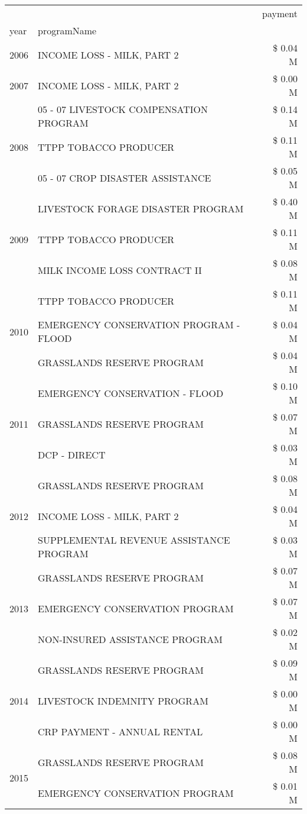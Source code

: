 \begin{tabular}{llr}
\toprule
 &  & payment \\
year & programName &  \\
\midrule
2006 & INCOME LOSS - MILK, PART 2 & \$ 0.04 M \\
\cline{1-3}
2007 & INCOME LOSS - MILK, PART 2 & \$ 0.00 M \\
\cline{1-3}
\multirow[t]{3}{*}{2008} & 05 - 07 LIVESTOCK COMPENSATION PROGRAM & \$ 0.14 M \\
 & TTPP TOBACCO PRODUCER & \$ 0.11 M \\
 & 05 - 07 CROP DISASTER ASSISTANCE & \$ 0.05 M \\
\cline{1-3}
\multirow[t]{3}{*}{2009} & LIVESTOCK FORAGE DISASTER  PROGRAM & \$ 0.40 M \\
 & TTPP TOBACCO PRODUCER & \$ 0.11 M \\
 & MILK INCOME LOSS CONTRACT II & \$ 0.08 M \\
\cline{1-3}
\multirow[t]{3}{*}{2010} & TTPP TOBACCO PRODUCER & \$ 0.11 M \\
 & EMERGENCY CONSERVATION PROGRAM - FLOOD & \$ 0.04 M \\
 & GRASSLANDS RESERVE PROGRAM & \$ 0.04 M \\
\cline{1-3}
\multirow[t]{3}{*}{2011} & EMERGENCY CONSERVATION - FLOOD & \$ 0.10 M \\
 & GRASSLANDS RESERVE PROGRAM & \$ 0.07 M \\
 & DCP - DIRECT & \$ 0.03 M \\
\cline{1-3}
\multirow[t]{3}{*}{2012} & GRASSLANDS RESERVE PROGRAM & \$ 0.08 M \\
 & INCOME LOSS - MILK, PART 2 & \$ 0.04 M \\
 & SUPPLEMENTAL REVENUE ASSISTANCE PROGRAM & \$ 0.03 M \\
\cline{1-3}
\multirow[t]{3}{*}{2013} & GRASSLANDS RESERVE PROGRAM & \$ 0.07 M \\
 & EMERGENCY CONSERVATION PROGRAM & \$ 0.07 M \\
 & NON-INSURED ASSISTANCE PROGRAM & \$ 0.02 M \\
\cline{1-3}
\multirow[t]{3}{*}{2014} & GRASSLANDS RESERVE PROGRAM & \$ 0.09 M \\
 & LIVESTOCK INDEMNITY PROGRAM & \$ 0.00 M \\
 & CRP PAYMENT - ANNUAL RENTAL & \$ 0.00 M \\
\cline{1-3}
\multirow[t]{3}{*}{2015} & GRASSLANDS RESERVE PROGRAM & \$ 0.08 M \\
 & EMERGENCY CONSERVATION PROGRAM & \$ 0.01 M \\

\end{tabular}
